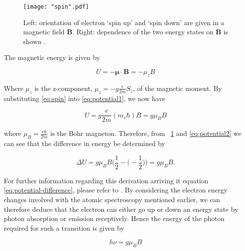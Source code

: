 \documentclass{article}
\newcommand{\figref}[2][\figurename~]{#1\ref{#2}}
\begin{document}
\begin{figure}[h]
\centering
\texttt{[image: "spin".pdf]}
\caption{Left: orientation of electron `spin up' and `spin down' are given in a magnetic field \textbf{B}. Right: dependence of the two energy states on \textbf{B} is shown \cite{Paper02}.}
\label{fig:spin}
\end{figure}

\vspace{2mm}
\noindent
The magnetic energy is given by \cite{Paper02}

\begin{equation}
\label{eq:potential1}
U = -\boldsymbol{\mu} \cdot \textbf{B} = - \mu_zB
\end{equation}

\vspace{2mm}
\noindent
Where $\mu_z$ is the z-component, $\mu_z = -g\frac{e}{2m}S_z$, of the magnetic moment. By substituting \eqref{eq:spin} into \eqref{eq:potential1}, we now have


\begin{equation}
\label{eq:potential2}
U = g\frac{e}{2m}(m_s\hbar)B = g\mu_BB
\end{equation}

\vspace{2mm}
\noindent
where $\mu_B = \frac{e\hbar}{2m}$ is the Bohr magneton. Therefore, from \figref{fig:spin} and \eqref{eq:potential2} we can see that the difference in energy be determined by \cite{Paper02}

\begin{equation}
\label{eq:potential-difference}
\Delta U = g\mu_BB\Big(\frac{1}{2} - \Big(-\frac{1}{2}\Big)\Big) = g\mu_BB.
\end{equation}

\vspace{2mm}
\noindent
For further information regarding this derivation arriving it equation \eqref{eq:potential-difference}, please refer to \cite{Book01}. By considering the electron energy changes involved with the atomic spectroscopy mentioned earlier, we can therefore deduce that the electron can either go up or down an energy state by photon absorption or emission receptively. Hence the energy of the photon required for such a transition is given by

\begin{equation}
\label{eq:frequency-equation}
h\nu = g\mu_BB
\end{equation}
\end{document}
